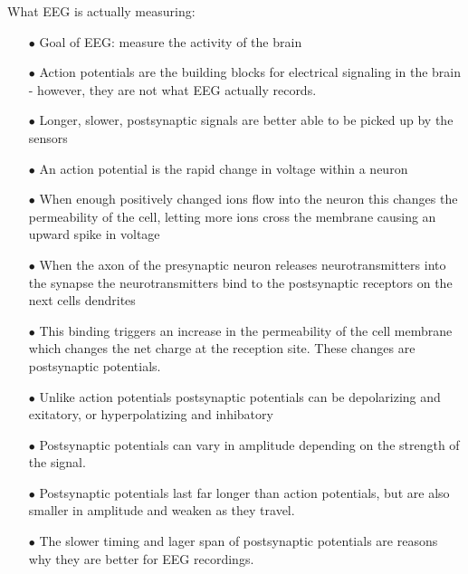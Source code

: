 \documentclass[aspectratio=169, 9pt]{beamer}
\begin{document}
\begin{frame}{What EEG is actually measuring:}
    \begin{itemize}
        \item[$\bullet$] Goal of EEG: measure the activity of the brain
        \item[$\bullet$] Action potentials are the building blocks for electrical signaling in the brain - however, they are not what EEG actually records.
        \item[$\bullet$] Longer, slower, postsynaptic signals are better able to be picked up by the sensors

        \item[$\bullet$] An action potential is the rapid change in voltage within a neuron
        \item[$\bullet$] When enough positively changed ions flow into the neuron this changes the permeability of the cell, letting more ions cross the membrane causing an upward spike in voltage

        \item[$\bullet$] When the axon of the presynaptic neuron releases neurotransmitters into the synapse the neurotransmitters bind to the postsynaptic receptors on the next cells dendrites
        \item[$\bullet$] This binding triggers an increase in the permeability of the cell membrane which changes the net charge at the reception site. These changes are postsynaptic potentials.
        \item[$\bullet$] Unlike action potentials postsynaptic potentials can be depolarizing and exitatory, or hyperpolatizing and inhibatory
        \item[$\bullet$] Postsynaptic potentials can vary in amplitude depending on the strength of the signal.
        \item[$\bullet$] Postsynaptic potentials last far longer than action potentials, but are also smaller in amplitude and weaken as they travel.
        \item[$\bullet$] The slower timing and lager span of postsynaptic potentials are reasons why they are better for EEG recordings.
    \end{itemize}
\end{frame}
\end{document}

